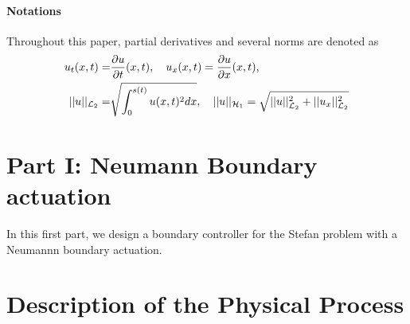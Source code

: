 \documentclass[journal]{IEEEtran}
\begin{document}
\paragraph{Notations}
Throughout this paper, partial derivatives and several norms are denoted as 
\begin{align}
u_{t}(x,t) =& \frac{\partial u}{\partial t} (x,t), \quad u_{x}(x,t) = \frac{\partial u}{\partial x} (x,t), \notag\\
||u||_{{\cal L}_2} = &\sqrt{\int_0^{s(t)} u(x,t)^2 dx}, \quad ||u||_{{\cal H}_1} = \sqrt{||u||_{{\cal L}_2}^2 + ||u_{x}||_{{\cal L}_2}^2} \notag
\end{align}

\section*{Part I: Neumann Boundary  actuation}

In this first part, we design a boundary controller for the Stefan problem with a Neumannn boundary actuation.

\section{Description of the Physical Process}\label{model}
\end{document}
